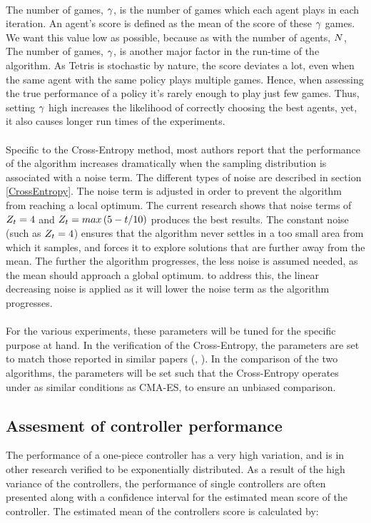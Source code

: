 \\
The number of games, $\gamma$, 
is the number of games  which each agent 
plays in each iteration. An agent's score is defined as the 
mean of the score of these 
$\gamma$ games.
We want this value low as possible, because as with the number of
agents, $N$, The number of games, $\gamma$, 
is another major factor in the run-time of the algorithm.
As Tetris is stochastic by nature, the score deviates a lot, 
even when the
same agent with the same policy plays multiple games. 
Hence, when assessing the true
performance of a policy it's rarely enough to play just few games. Thus, setting 
$\gamma$ high increases the likelihood of correctly choosing the best 
agents, yet, it also causes longer run times of the experiments.\\
\\
Specific to the Cross-Entropy method, 
most authors report that the performance of the 
algorithm increases dramatically when the sampling 
distribution is associated with
a noise term. The different types of 
noise are described in section \ref{CrossEntropy}.
The noise term is adjusted in order to 
prevent the algorithm from reaching a local optimum.
The current research shows that noise terms of $Z_t = 4$ and 
$Z_t = max \left( 5 - t / 10 \right)$ 
\citep{thiery:09} produces the best results.
The constant noise (such as $Z_t = 4$) ensures that the algorithm
never settles in a too small area from which it samples, and forces it to explore
solutions that are further away from the mean. The further the 
algorithm progresses, 
the less noise is assumed needed, as the mean should approach a global optimum. to
address this, the linear decreasing noise 
is applied as it will lower the noise term
as the algorithm progresses.\\
\\
For the various experiments, these 
parameters will be tuned for the specific purpose 
at hand. In the verification of the Cross-Entropy, the parameters are set 
to match those reported in similar papers (\cite{thiery:09}, \cite{szita:06}).
In the comparison of the two algorithms, the parameters will be set such that 
the Cross-Entropy operates under as 
similar conditions as CMA-ES, to ensure an unbiased 
comparison.

\subsection{Assesment of controller performance}
The performance of a one-piece controller has a very high variation,
and is in other research verified to be exponentially distributed.
As a result of the high variance of the controllers, the performance 
of single controllers are often presented along with a confidence interval
for the estimated mean score of the controller. The estimated mean of 
the controllers score is calculated by:

